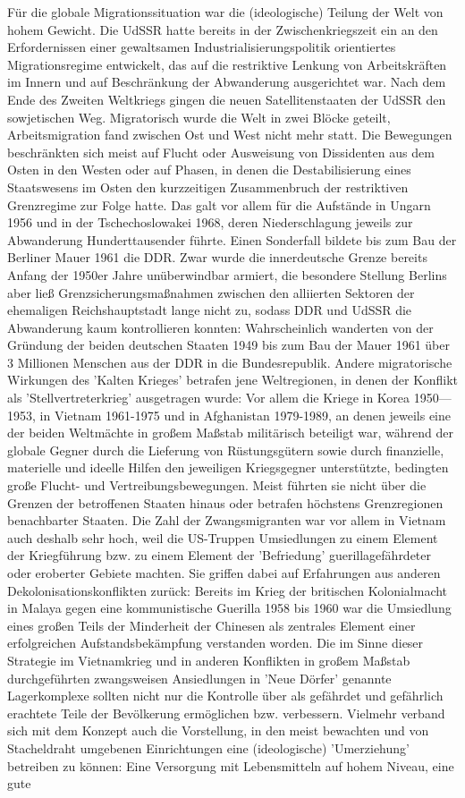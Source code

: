 \documentclass[letterpaper, 12pt]{article}
\begin{document}
Für die globale Migrationssituation war die (ideologische) Teilung der Welt von hohem Gewicht. Die UdSSR hatte bereits in der Zwischenkriegszeit ein an den Erfordernissen einer gewaltsamen Industrialisierungspolitik orientiertes Migrationsregime entwickelt, das auf die restriktive Lenkung von Arbeitskräften im Innern und auf Beschränkung der Abwanderung ausgerichtet war. Nach dem Ende des Zweiten Weltkriegs gingen die neuen Satellitenstaaten der UdSSR den sowjetischen Weg. Migratorisch wurde die Welt in zwei Blöcke geteilt, Arbeitsmigration fand zwischen Ost und West nicht mehr statt. Die Bewegungen beschränkten sich meist auf Flucht oder Ausweisung von Dissidenten aus dem Osten in den Westen oder auf Phasen, in denen die Destabilisierung eines Staatswesens im Osten den kurzzeitigen Zusammenbruch der restriktiven Grenzregime zur Folge hatte. Das galt vor allem für die Aufstände in Ungarn 1956 und in der Tschechoslowakei 1968, deren Niederschlagung jeweils zur Abwanderung Hunderttausender führte. Einen Sonderfall bildete bis zum Bau der Berliner Mauer 1961 die DDR. Zwar wurde die innerdeutsche Grenze bereits Anfang der 1950er Jahre unüberwindbar armiert, die besondere Stellung Berlins aber ließ Grenzsicherungsmaßnahmen zwischen den alliierten Sektoren der ehemaligen Reichshauptstadt lange nicht zu, sodass DDR und UdSSR die Abwanderung kaum kontrollieren konnten: Wahrscheinlich wanderten von der Gründung der beiden deutschen Staaten 1949 bis zum Bau der Mauer 1961 über 3 Millionen Menschen aus der DDR in die Bundesrepublik. Andere migratorische Wirkungen des 'Kalten Krieges' betrafen jene Weltregionen, in denen der Konflikt als 'Stellvertreterkrieg' ausgetragen wurde: Vor allem die Kriege in Korea 1950— 1953, in Vietnam 1961-1975 und in Afghanistan 1979-1989, an denen jeweils eine der beiden Weltmächte in großem Maßstab militärisch beteiligt war, während der globale Gegner durch die Lieferung von Rüstungsgütern sowie durch finanzielle, materielle und ideelle Hilfen den jeweiligen Kriegsgegner unterstützte, bedingten große Flucht- und Vertreibungsbewegungen. Meist führten sie nicht über die Grenzen der betroffenen Staaten hinaus oder betrafen höchstens Grenzregionen benachbarter Staaten. Die Zahl der Zwangsmigranten war vor allem in Vietnam auch deshalb sehr hoch, weil die US-Truppen Umsiedlungen zu einem Element der Kriegführung bzw. zu einem Element der 'Befriedung' guerillagefährdeter oder eroberter Gebiete machten. Sie griffen dabei auf Erfahrungen aus anderen Dekolonisationskonflikten zurück: Bereits im Krieg der britischen Kolonialmacht in Malaya gegen eine kommunistische Guerilla 1958 bis 1960 war die Umsiedlung eines großen Teils der Minderheit der Chinesen als zentrales Element einer erfolgreichen Aufstandsbekämpfung verstanden worden. Die im Sinne dieser Strategie im Vietnamkrieg und in anderen Konflikten in großem Maßstab durchgeführten zwangsweisen Ansiedlungen in 'Neue Dörfer' genannte Lagerkomplexe sollten nicht nur die Kontrolle über als gefährdet und gefährlich erachtete Teile der Bevölkerung ermöglichen bzw. verbessern. Vielmehr verband sich mit dem Konzept auch die Vorstellung, in den meist bewachten und von Stacheldraht umgebenen Einrichtungen eine (ideologische) 'Umerziehung' betreiben zu können: Eine Versorgung mit Lebensmitteln auf hohem Niveau, eine gute 
\end{document}
